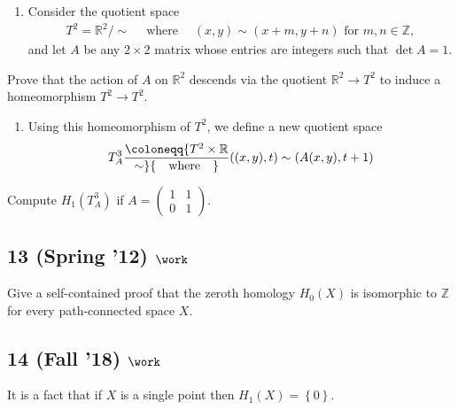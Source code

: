 \begin{enumerate}
\def\labelenumi{\alph{enumi}.}
\tightlist
\item
  Consider the quotient space
  \begin{align*}
  T^2 = {\mathbb{R}}^2 / \sim {\quad \operatorname{where} \quad} (x, y) \sim (x + m, y + n) \text{ for } m, n \in {\mathbb{Z}}
  ,\end{align*}
  and let \(A\) be any \(2 \times 2\) matrix whose entries are integers
  such that \(\det A = 1\).
\end{enumerate}

Prove that the action of \(A\) on \({\mathbb{R}}^2\) descends via the
quotient \({\mathbb{R}}^2 \to T^2\) to induce a homeomorphism
\(T^2 \to T^2\).

\begin{enumerate}
\def\labelenumi{\alph{enumi}.}
\setcounter{enumi}{1}
\tightlist
\item
  Using this homeomorphism of \(T^2\), we define a new quotient space
  \begin{align*}
  T_A^3 \coloneqq{T^2\times{\mathbb{R}}\over \sim} {\quad \operatorname{where} \quad} ((x, y), t) \sim (A(x, y), t + 1)
  \end{align*}
\end{enumerate}

Compute \(H_1 (T_A^3 )\) if
\(A=\left(\begin{array}{ll} 1 & 1 \\ 0 & 1 \end{array}\right).\)

\hypertarget{spring-12-work-2}{%
\subsection{\texorpdfstring{13 (Spring '12)
\(\work\)}{13 (Spring '12) \textbackslash work}}\label{spring-12-work-2}}

Give a self-contained proof that the zeroth homology \(H_0 (X)\) is
isomorphic to \({\mathbb{Z}}\) for every path-connected space \(X\).

\hypertarget{fall-18-work-5}{%
\subsection{\texorpdfstring{14 (Fall '18)
\(\work\)}{14 (Fall '18) \textbackslash work}}\label{fall-18-work-5}}

It is a fact that if \(X\) is a single point then
\(H_1 (X) = \left\{{0}\right\}\).

